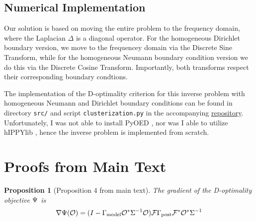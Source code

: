 \documentclass{article}
\newtheorem{proposition}{Proposition}
\begin{document}
\subsection{Numerical Implementation}
Our solution is based on moving the entire problem to the frequency
domain, where the Laplacian $\Delta$ is a diagonal operator. For the
homogeneous Dirichlet boundary version, we move to the frequencey
domain via the Discrete Sine Transform, while for the homogeneous
Neumann boundary condition version we do this via the Discrete Cosine
Transform. Importantly, both transforms respect their corresponding
boundary condtions.

The implementation of the D-optimality criterion for this inverse
problem with homogeneous Neumann and Dirichlet boundary conditions can
be found in directory \texttt{src/} and script
\texttt{clusterization.py} in the accompanying
\href{https://github.com/yairdaon/OED}{repository}. Unfortunately, I
was not able to install PyOED \cite{attia2023pyoed}, nor was I able to
utilize hIPPYlib \cite{VillaPetraGhattas16, VillaPetraGhattas18,
  VillaPetraGhattas21}, hence the inverse problem is implemented from
scratch.










\section{Proofs from Main Text}

\begin{proposition}[Proposition 4 from main text]%
  The gradient of the D-optimality objective $\Psi$ is
  \begin{equation*}
    \nabla \Psi(\mathcal{O}) = ( I - \Gamma_{\textup{model}} \mathcal{O}^* \Sigma^{-1}\mathcal{O} ) \mathcal{F}
    \Gamma_{\textup{post}} \mathcal{F}^* \mathcal{O}^* \Sigma^{-1}
  \end{equation*}
\end{proposition}
\end{document}
